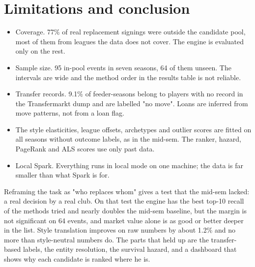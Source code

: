 \documentclass[11pt,a4paper]{article}
\begin{document}
\section{Limitations and conclusion}
\begin{itemize}
\item Coverage. 77\% of real replacement signings were outside the candidate pool, most of them from leagues the data does not cover. The engine is evaluated only on the rest.
\item Sample size. 95 in-pool events in seven seasons, 64 of them unseen. The intervals are wide and the method order in the results table is not reliable.
\item Transfer records. 9.1\% of feeder-seasons belong to players with no record in the Transfermarkt dump and are labelled "no move". Loans are inferred from move patterns, not from a loan flag.
\item The style elasticities, league offsets, archetypes and outlier scores are fitted on all seasons without outcome labels, as in the mid-sem. The ranker, hazard, PageRank and ALS scores use only past data.
\item Local Spark. Everything runs in local mode on one machine; the data is far smaller than what Spark is for.
\end{itemize}
Reframing the task as "who replaces whom" gives a test that the mid-sem lacked: a real decision by a real club. On that test the engine has the best top-10 recall of the methods tried and nearly doubles the mid-sem baseline, but the margin is not significant on 64 events, and market value alone is as good or better deeper in the list. Style translation improves on raw numbers by about 1.2\% and no more than style-neutral numbers do. The parts that held up are the transfer-based labels, the entity resolution, the survival hazard, and a dashboard that shows why each candidate is ranked where he is.
\end{document}
